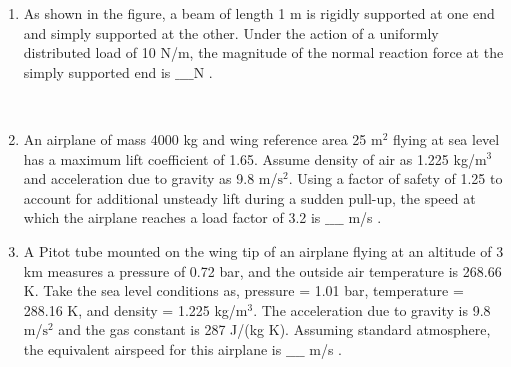 \documentclass[journal]{IEEEtran}
\begin{document}
\begin{enumerate}
\begin{figure}[!ht]
{}%
\end{figure}\\
\item As shown in the figure, a beam of length 1 m is rigidly supported at one end and simply supported at the other. Under the action of a uniformly distributed load of 10 N/m, the magnitude of the normal reaction force at the simply supported end is $\_\_\_\_$N .
\begin{figure}[!ht]
\centering
\resizebox{0.5\textwidth}{!}{%

}%
\end{figure}\\
\item An airplane of mass 4000 kg and wing reference area 25 $\text{m}^2$ flying at sea level has a maximum lift coefficient of 1.65. Assume density of air as 1.225 kg/$\text{m}^3$ and acceleration due to gravity as 9.8 m/$\text{s}^2$. Using a factor of safety of 1.25 to account for additional unsteady lift during a sudden pull-up, the speed at which the airplane reaches a load factor of 3.2 is $\_\_\_\_$ m/s . \\
\item A Pitot tube mounted on the wing tip of an airplane flying at an altitude of 3 km measures a pressure of 0.72 bar, and the outside air temperature is 268.66 K. Take the sea level conditions as, pressure = 1.01 bar, temperature = 288.16 K, and density = 1.225 kg/$\text{m}^3$. The acceleration due to gravity is 9.8 m/$\text{s}^2$ and the gas constant is 287 J/(kg K). Assuming standard atmosphere, the equivalent airspeed for this airplane is $\_\_\_\_$ m/s . \\
			 \end{enumerate}
			 
\end{document}
